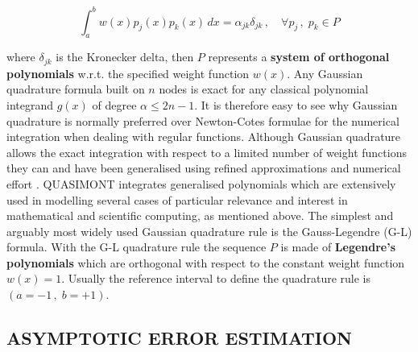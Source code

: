 \documentclass[a4paper, twosided]{book}
\begin{document}
\begin{equation}\label{eq1.6}
    \int_a^b w(x)p_j(x)p_k(x)\,dx = \alpha_{jk}\delta_{jk}\,,\quad\forall p_j\,,\;p_k\in P
\end{equation}

\noindent
where $\delta_{jk}$ is the Kronecker delta, then $P$ represents a \color{poliDarkBlue} \textbf{system of orthogonal polynomials} \color{black} w.r.t. the specified weight function $w(x)$. Any Gaussian quadrature formula built on  $n$ nodes is exact for any classical polynomial integrand $g(x)$ of degree $\alpha\leq 2n-1$. It is therefore easy to see why Gaussian quadrature is normally preferred over Newton-Cotes formulae for the numerical integration when dealing with regular functions. Although Gaussian quadrature allows the exact integration with respect to a limited number of weight functions they can and have been generalised using refined approximations and numerical effort \cite{Gautschi94}. QUASIMONT integrates generalised polynomials which are extensively used in modelling several cases of particular relevance and interest in mathematical and scientific computing, as mentioned above. The simplest and arguably most widely used Gaussian quadrature rule is the Gauss-Legendre (G-L) formula. With the G-L quadrature rule the sequence $P$ is made of \color{poliDarkBlue} \textbf{Legendre's polynomials} \color{black} which are orthogonal with respect to the constant weight function $w(x)=1$. Usually the reference interval to define the quadrature rule is $(a=-1\,,\;b=+1)$.

\subsection[Asymptotic error estimation]{\changefont ASYMPTOTIC ERROR ESTIMATION \color{black}}\label{SubSec1.2.3}
\end{document}
